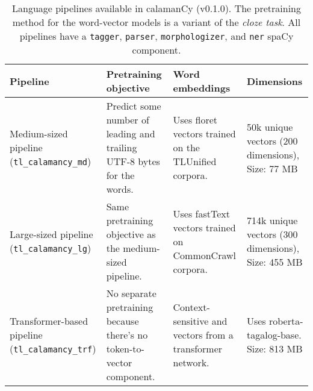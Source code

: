 \documentclass[../emnlp2023.tex]{subfiles}
\begin{document}
\begin{table*}[t]
\begin{tabular}{@{}p{3cm}p{4cm}p{4cm}p{4cm}@{}}
\toprule
Pipeline  &  Pretraining objective & Word embeddings & Dimensions \\ \midrule
Medium-sized pipeline (\texttt{tl\_calamancy\_md}) & Predict some number of leading and trailing UTF-8 bytes for the words. & Uses floret vectors trained on the TLUnified corpora. & 50k unique vectors (200 dimensions), Size: 77 MB\\
Large-sized pipeline (\texttt{tl\_calamancy\_lg})  & Same pretraining objective as the medium-sized pipeline.    & Uses fastText vectors trained on CommonCrawl corpora.                  & 714k unique vectors (300 dimensions), Size: 455 MB \\
Transformer-based pipeline (\texttt{tl\_calamancy\_trf}) & No separate pretraining because there's no token-to-vector component. & Context-sensitive and vectors from a transformer network.      & Uses roberta-tagalog-base. Size: 813 MB  \\ \bottomrule
\end{tabular}
\caption{
    Language pipelines available in calamanCy (v0.1.0).
    The pretraining method for the word-vector models is a variant of the \textit{cloze task}.
    All pipelines have a \texttt{tagger}, \texttt{parser}, \texttt{morphologizer}, and \texttt{ner} spaCy component.
}
\label{table:calamancy_pipelines}
\end{table*}
\end{document}
